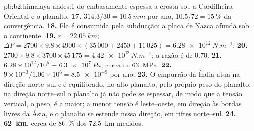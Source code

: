 \begin{solution}{pb:b2:himalaya-andes:1}
do embasamento espessa a crosta sob a Cordilheira Oriental e o planalto.
\textbf{17.} $314.3/30 = \qty{10.5}{mm}$ por ano, $10.5/72 = \qty{15}{\percent}$ da
convergência.
\textbf{18.} Ela é consumida pela subducção: a placa de Nazca afunda sob o continente.
\textbf{19.} $r = \qty{22.05}{km}$; $\Delta F = 2700\times9.8\times4900\times(35\,000 + 2450
+ 11\,025) = \qty{6.28e12}{N.m^{-1}}$.
\textbf{20.} $2700\times9.8\times3700\times45\,175 = \qty{4.42e12}{N.m^{-1}}$; a razão é de
0.70.
\textbf{21.} $6.28\times10^{12}/10^{5} = \qty{6.3e7}{Pa}$, cerca de \qty{63}{MPa}.
\textbf{22.} $9\times10^{-3}/1.06\times10^{6} = \num{8.5e-9}$ por ano.
\textbf{23.} O empurrão da Índia atua na direção norte--sul e é equilibrado, no alto planalto, pelo
próprio peso do planalto: na direção norte--sul o planalto já não pode se espessar, de modo que a tensão vertical,
o peso, é a maior; a menor tensão é leste--oeste, em direção às bordas livres da Ásia,
e o planalto se estende nessa direção, em riftes norte--sul.
\textbf{24.} \textbf{\qty[text-series-to-math=true]{62}{km}}, cerca de \qty{86}{\percent} dos
\qty{72.5}{km} medidos.
\end{solution}
